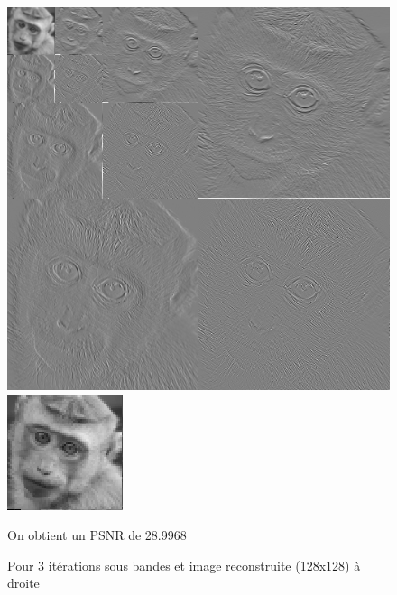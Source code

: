\documentclass{article}
\begin{document}
\begin{figure}[h!]
\centerline{ \includegraphics[scale=0.5]{./rendus/4sousBandes3iterPGM.png} \includegraphics[scale=2]{./rendus/Reconstruite3.png} }
\caption{Pour 3 itérations  sous bandes et image reconstruite (128x128) à droite} 
On obtient un PSNR de 28.9968
\end{figure}
\end{document}
